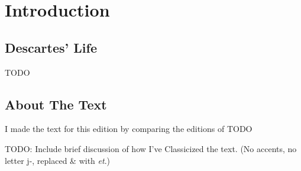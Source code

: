 \chapter*{Introduction}

\section*{Descartes' Life}

TODO

\section*{About The Text}

I made the text for this edition by comparing the editions of TODO

TODO: Include brief discussion of how I've Classicized the text. (No accents, no letter j-, replaced \& with \textit{et}.)


